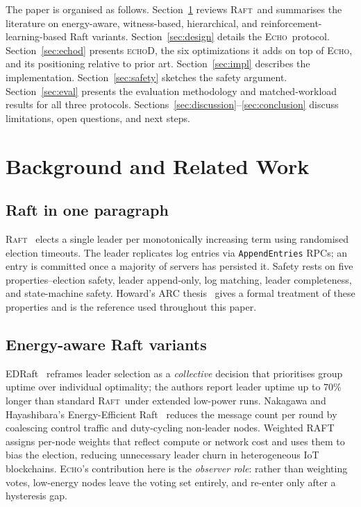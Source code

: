 \documentclass[conference]{IEEEtran}
\newcommand{\echoproto}{\textsc{Echo}\xspace}
\newcommand{\raftproto}{\textsc{Raft}\xspace}
\newcommand{\echodproto}{\textsc{echoD}\xspace}
\begin{document}
The paper is organised as follows. Section~\ref{sec:background} reviews
\raftproto\ and summarises the literature on energy-aware, witness-based,
hierarchical, and reinforcement-learning-based Raft variants.
Section~\ref{sec:design} details the \echoproto\ protocol.
Section~\ref{sec:echod} presents \echodproto, the six optimizations it
adds on top of \echoproto, and its positioning relative to prior art.
Section~\ref{sec:impl} describes the implementation.
Section~\ref{sec:safety} sketches the safety argument.
Section~\ref{sec:eval} presents the evaluation methodology and
matched-workload results for all three protocols.
Sections~\ref{sec:discussion}--\ref{sec:conclusion} discuss limitations,
open questions, and next steps.

\section{Background and Related Work}\label{sec:background}

\subsection{Raft in one paragraph}
\raftproto~\cite{ongaro2014raft} elects a single leader per
monotonically increasing term using randomised election timeouts. The
leader replicates log entries via \texttt{AppendEntries} RPCs; an entry
is committed once a majority of servers has persisted it. Safety rests
on five properties--election safety, leader append-only, log matching,
leader completeness, and state-machine safety. Howard's ARC
thesis~\cite{howard2021arc} gives a formal treatment of these properties
and is the reference used throughout this paper.

\subsection{Energy-aware Raft variants}
EDRaft~\cite{barros2023edraft} reframes leader selection as a
\emph{collective} decision that prioritises group uptime over individual
optimality; the authors report leader uptime up to 70\% longer than
standard \raftproto\ under extended low-power runs. Nakagawa and
Hayashibara's Energy-Efficient Raft~\cite{nakagawa2017energy} reduces
the message count per round by coalescing control traffic and duty-cycling
non-leader nodes. Weighted RAFT~\cite{xu2021weighted} assigns per-node
weights that reflect compute or network cost and uses them to bias the
election, reducing unnecessary leader churn in heterogeneous IoT
blockchains. \echoproto's contribution here is the \emph{observer role}:
rather than weighting votes, low-energy nodes leave the voting set
entirely, and re-enter only after a hysteresis gap.
\end{document}
